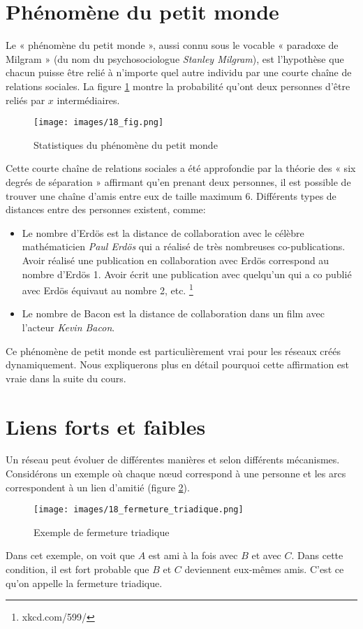 \section{Phénomène du petit monde}
Le « phénomène du petit monde », aussi connu sous le vocable « paradoxe de Milgram » (du nom du psychosociologue  \textit{Stanley Milgram}), est l'hypothèse que chacun puisse être relié à n'importe quel autre individu par une courte chaîne de relations sociales. La figure \ref{petit_monde} montre la probabilité qu'ont deux personnes d'être reliés par $x$ intermédiaires. 
\begin{figure}[!ht]
	\center
	\texttt{[image: images/18\_fig.png]}
	\caption{\label{petit_monde} Statistiques du phénomène du petit monde}
	\end{figure}
Cette  courte chaîne de relations sociales a été approfondie par la théorie des « six degrés de séparation » affirmant qu'en prenant deux personnes, il est possible de trouver une chaîne d'amis entre eux de taille maximum 6.
Différents types de distances entre des personnes existent, comme:
	\begin{itemize}
	\item Le nombre d'Erdös est la distance de collaboration avec le célèbre mathématicien  \textit{Paul Erdös} qui a réalisé de très nombreuses co-publications. Avoir réalisé une publication en collaboration avec Erdös correspond au nombre d'Erdös 1. Avoir écrit une publication avec quelqu'un qui a co publié avec Erdös équivaut au nombre 2, etc. \footnote{xkcd.com/599/}
	\item Le nombre de Bacon est la distance de collaboration dans un film avec l'acteur  \textit{Kevin Bacon}.
	\end{itemize}
Ce phénomène de petit monde est particulièrement vrai pour les réseaux créés dynamiquement. Nous expliquerons plus en détail pourquoi cette affirmation est vraie dans la suite du cours.

\section{Liens forts et faibles}

Un réseau peut évoluer de différentes manières et selon différents mécanismes.
Considérons un exemple où chaque n\oe ud correspond à une personne et les arcs correspondent à un lien d'amitié (figure \ref{fermeture_triadique}).
	\begin{figure}[!h]
	\center
	\texttt{[image: images/18\_fermeture\_triadique.png]}
	\caption{\label{fermeture_triadique} Exemple de fermeture triadique}
	\end{figure}
Dans cet exemple, on voit que $A$ est ami à la fois avec $B$ et avec $C$. Dans cette condition, il est fort probable que $B$ et $C$ deviennent eux-mêmes amis. C'est ce qu'on appelle la fermeture triadique.


